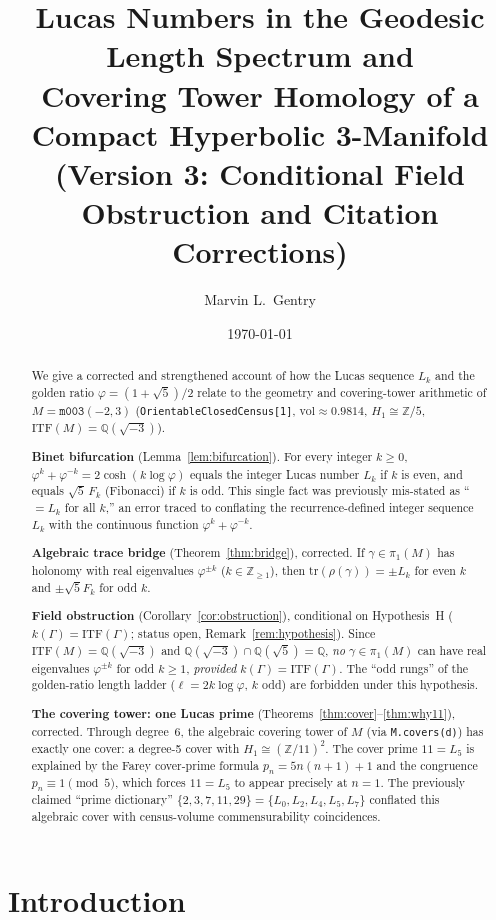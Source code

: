 \documentclass[12pt]{article}
\title{Lucas Numbers in the Geodesic Length Spectrum and\\
Covering Tower Homology of a Compact Hyperbolic 3-Manifold\\
\large (Version 3: Conditional Field Obstruction and Citation
Corrections)}
\author[1]{Marvin L.\ Gentry}
\affil[1]{Independent Researcher, Seattle, WA\\
\texttt{drmlgentry@protonmail.com} \quad ORCID: 0009-0006-4550-2663}
\date{\today}
\theoremstyle{definition}
\newcommand{\Z}{\mathbb{Z}}
\newcommand{\Q}{\mathbb{Q}}
\newcommand{\ph}{\varphi}
\newcommand{\logph}{\log\ph}
\newcommand{\tr}{\mathrm{tr}}
\newcommand{\ITF}{\mathrm{ITF}}
\begin{document}
\maketitle

\begin{abstract}
We give a corrected and strengthened account of how the Lucas
sequence $L_k$ and the golden ratio $\ph=(1+\sqrt5)/2$ relate to the
geometry and covering-tower arithmetic of
$M=\texttt{m003}(-2,3)$ (\texttt{OrientableClosedCensus[1]},
$\mathrm{vol}\approx0.9814$, $H_1\cong\Z/5$, $\ITF(M)=\Q(\sqrt{-3})$).

\textbf{Binet bifurcation} (Lemma~\ref{lem:bifurcation}). For every
integer $k\geq0$,
$\ph^k+\ph^{-k}=2\cosh(k\logph)$ equals the integer Lucas number $L_k$
if $k$ is even, and equals $\sqrt5\,F_k$ (Fibonacci) if $k$ is odd.
This single fact was previously mis-stated as ``$=L_k$ for all $k$,''
an error traced to conflating the recurrence-defined integer sequence
$L_k$ with the continuous function $\ph^k+\ph^{-k}$.

\textbf{Algebraic trace bridge} (Theorem~\ref{thm:bridge}), corrected.
If $\gamma\in\pi_1(M)$ has holonomy with real eigenvalues $\ph^{\pm k}$
($k\in\Z_{\geq1}$), then $\tr(\rho(\gamma))=\pm L_k$ for even $k$ and
$\pm\sqrt5 F_k$ for odd $k$.

\textbf{Field obstruction} (Corollary~\ref{cor:obstruction}), conditional
on Hypothesis~H ($k(\Gamma)=\ITF(\Gamma)$; status open,
Remark~\ref{rem:hypothesis}). Since $\ITF(M)=\Q(\sqrt{-3})$
and $\Q(\sqrt{-3})\cap\Q(\sqrt5)=\Q$, \emph{no} $\gamma\in\pi_1(M)$
can have real eigenvalues $\ph^{\pm k}$ for odd $k\geq1$, \emph{provided}
$k(\Gamma)=\ITF(\Gamma)$. The
``odd rungs'' of the golden-ratio length ladder
($\ell=2k\logph$, $k$ odd) are forbidden under this hypothesis.

\textbf{The covering tower: one Lucas prime}
(Theorems~\ref{thm:cover}--\ref{thm:why11}), corrected. Through
degree~6, the algebraic covering tower of $M$
(via \texttt{M.covers(d)}) has exactly one cover: a degree-5 cover
with $H_1\cong(\Z/11)^2$. The cover prime $11=L_5$ is explained by the
Farey cover-prime formula $p_n=5n(n+1)+1$ and the congruence
$p_n\equiv1\pmod5$, which forces $11=L_5$ to appear precisely at
$n=1$. The previously claimed ``prime dictionary''
$\{2,3,7,11,29\}=\{L_0,L_2,L_4,L_5,L_7\}$ conflated this algebraic
cover with census-volume commensurability coincidences.
\end{abstract}

\section{Introduction}
\end{document}
